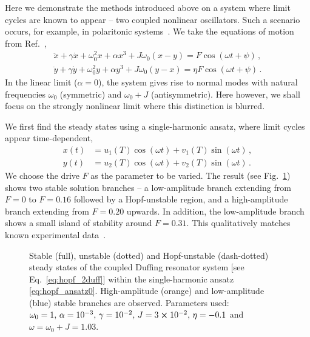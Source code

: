 Here we demonstrate the methods introduced above on a system where limit cycles are known to appear -- two coupled nonlinear oscillators. Such a scenario occurs, for example, in polaritonic systems~\cite{Zambon_2020}. We take the equations of motion from Ref.~\cite{Zambon_2020},
\begin{equation} \label{eq:hopf_2duff} 
\begin{gathered}
\ddot{x} + \gamma \dot{x} + \omega_0^2 x + \alpha x^3 + J \omega_0 (x-y) = F \cos(\omega t + \psi) \,, \\
\ddot{y} + \gamma \dot{y} + \omega_0^2 y + \alpha y^3 + J \omega_0 (y-x) = \eta F \cos(\omega t + \psi) \,. 
\end{gathered}
\end{equation}
In the linear limit ($\alpha = 0$), the system gives rise to normal modes with natural frequencies $\omega_0$ (symmetric) and $\omega_0 + J $ (antisymmetric). Here however, we shall focus on the strongly nonlinear limit where this distinction is blurred. 
	
We first find the steady states using a single-harmonic ansatz, where limit cycles appear time-dependent,
\begin{equation}
\begin{aligned} \label{eq:hopf_ansatz0}
x(t) &= u_1(T) \cos(\omega t) + v_1(T) \sin(\omega t) \,,  \\y(t) &= u_2(T) \cos(\omega t ) + v_2(T) \sin(\omega t)\,.
\end{aligned}
\end{equation}
We choose the drive $F$ as the parameter to be varied. The result (see Fig.~\ref{fig:hopf_ansatz0}) shows two stable solution branches -- a low-amplitude branch extending from $F = 0$ to $F=0.16$ followed by a Hopf-unstable region, and a high-amplitude branch extending from $F=0.20$ upwards. In addition, the low-amplitude branch shows a small island of stability around $F=0.31$. This qualitatively matches known experimental data~\cite{Zambon_2020}.
%
\begin{figure} [h!]
	\centering
	
	\caption{Stable (full), unstable (dotted) and Hopf-unstable (dash-dotted) steady states of the coupled Duffing resonator system [see Eq.~\eqref{eq:hopf_2duff}] within the single-harmonic ansatz \eqref{eq:hopf_ansatz0}. High-amplitude (orange) and low-amplitude (blue) stable branches are observed. Parameters used: $\omega_0 = 1, \, \alpha= 10^{-3}, \, \gamma=10^{-2}, \, J = 3\cross10^{-2}, \, \eta = -0.1$ and $ \omega = \omega_0 + J = 1.03$.}
	\label{fig:hopf_ansatz0}
\end{figure}

